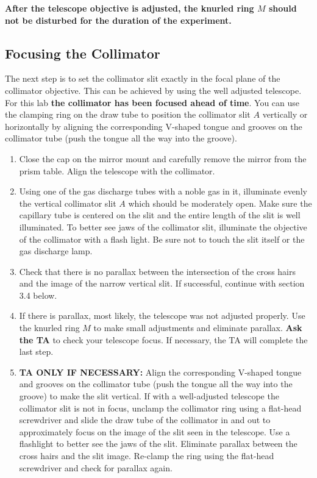 \documentclass[12pt]{article}
\begin{document}
\textbf{After the telescope objective is adjusted, the knurled ring $M$ should not be disturbed for the duration of the experiment.}

\subsection{Focusing the Collimator}
The next step is to set the collimator slit exactly in the focal plane of the collimator objective. This can be achieved by using the well adjusted telescope. For this lab  \textbf{the collimator has been focused ahead of time}. You can use the clamping ring on the draw tube to position the collimator slit $A$ vertically or horizontally by aligning the corresponding V-shaped tongue and grooves on the collimator tube (push the tongue all the way into the groove).
\begin{enumerate}
    \item Close the cap on the mirror mount and carefully remove the mirror from the prism table. Align the telescope with the collimator.
    \item Using one of the gas discharge tubes with a noble gas in it, illuminate evenly the vertical collimator slit $A$ which should be moderately open. Make sure the capillary tube is centered on the slit and the entire length of the slit is well illuminated. To better see jaws of the collimator slit, illuminate the objective of the collimator with a flash light. Be sure not to touch the slit itself or the gas discharge lamp.
    \item Check that there is no parallax between the intersection of the cross hairs and the image of the narrow vertical slit. If successful, continue with section 3.4 below.
    \item If there is parallax, most likely, the telescope was not adjusted properly. Use the knurled ring $M$ to make small adjustments and eliminate parallax. \textbf{Ask the TA} to check your telescope focus. If necessary, the TA will complete the last step.
    \item \textbf{TA ONLY IF NECESSARY:} Align the corresponding V-shaped tongue and grooves on the collimator tube (push the tongue all the way into the groove) to make the slit vertical. If with a well-adjusted telescope the collimator slit is not in focus, unclamp the collimator ring using a flat-head screwdriver and slide the draw tube of the collimator in and out to approximately focus on the image of the  slit seen in the telescope. Use a flashlight to better see the jaws of the slit. Eliminate parallax between the cross hairs and the slit image. Re-clamp the ring using the flat-head screwdriver and check for parallax again.
\end{enumerate}
\end{document}
